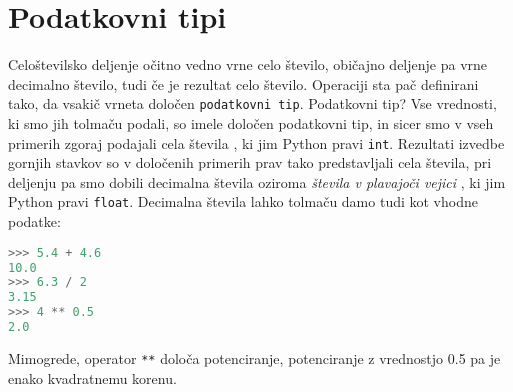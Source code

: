 \section{Podatkovni tipi}

Celoštevilsko deljenje očitno vedno vrne celo število, običajno deljenje pa vrne decimalno število, tudi če je rezultat celo število. Operaciji sta pač definirani tako, da vsakič vrneta določen \texttt{podatkovni tip}. Podatkovni tip? Vse vrednosti, ki smo jih tolmaču podali, so imele določen podatkovni tip, in sicer smo v vseh primerih zgoraj podajali cela števila , ki jim Python pravi \texttt{int}. Rezultati izvedbe gornjih stavkov so v določenih primerih prav tako predstavljali cela števila, pri deljenju pa smo dobili decimalna števila oziroma \emph{števila v plavajoči vejici} , ki jim Python pravi \texttt{float}. Decimalna števila lahko tolmaču damo tudi kot vhodne podatke:
\begin{lstlisting}[language=Python]
>>> 5.4 + 4.6
10.0
>>> 6.3 / 2
3.15
>>> 4 ** 0.5
2.0
\end{lstlisting}
Mimogrede, operator \texttt{**} določa potenciranje, potenciranje z vrednostjo 0.5 pa je enako kvadratnemu korenu. 

